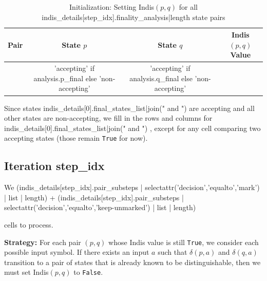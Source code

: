 {{{{{%
\begin{table}[h!]
\centering
\small
\begin{tabular}{c c c c}
\toprule
\textbf{Pair} & \textbf{State $p$} & \textbf{State $q$} & \textbf{Indis$(p,q)$ Value} \\
\midrule
{%
$({{ analysis.pair[0] }}, {{ analysis.pair[1] }})$ & 
{{ 'accepting' if analysis.p_final else 'non-accepting' }} & 
{{ 'accepting' if analysis.q_final else 'non-accepting' }} & 
{%
{%
\bottomrule
\end{tabular}
\caption{Initialization: Setting Indis$(p,q)$ for all {{ indis_details[step_idx].finality_analysis|length }} state pairs}
\end{table}
{%

{%
Since states {{ indis_details[0].final_states_list|join(" and ") }} are accepting and all other states are non-accepting, we fill in the rows and columns for {{ indis_details[0].final_states_list|join(" and ") }}, except for any cell comparing two accepting states (those remain \texttt{True} for now).
{%

{%
\subsection*{Iteration {{ step_idx }}}

We{%
  (indis_details[step_idx].pair_substeps | selectattr('decision','equalto','mark') | list | length) 
  + 
  (indis_details[step_idx].pair_substeps | selectattr('decision','equalto','keep-unmarked') | list | length) 
}} cells to process.{%

\textbf{Strategy:} For each pair $(p, q)$ whose Indis value is still \texttt{True}, we consider each possible input symbol. If there exists an input $a$ such that $\delta(p,a)$ and $\delta(q,a)$ transition to a pair of states that is already known to be distinguishable, then we must set Indis$(p,q)$ to \texttt{False}.

{%

}}}}}}}}}}
